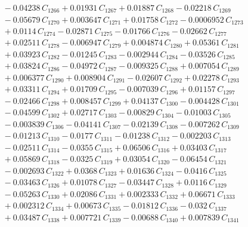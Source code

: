 \documentclass[a4paper,11pt]{article}
\begin{document}
\begin{align}
&\quad - 0.04238\,C_{1266} + 0.01931\,C_{1267} + 0.01887\,C_{1268} - 0.02218\,C_{1269} \nonumber\\
&\quad - 0.05679\,C_{1270} + 0.003647\,C_{1271} + 0.01758\,C_{1272} - 0.0006952\,C_{1273} \nonumber\\
&\quad + 0.0114\,C_{1274} - 0.02871\,C_{1275} - 0.01766\,C_{1276} - 0.02662\,C_{1277} \nonumber\\
&\quad + 0.02511\,C_{1278} - 0.006947\,C_{1279} + 0.004874\,C_{1280} + 0.05361\,C_{1281} \nonumber\\
&\quad + 0.03923\,C_{1282} - 0.01245\,C_{1283} - 0.002944\,C_{1284} - 0.03526\,C_{1285} \nonumber\\
&\quad + 0.03824\,C_{1286} - 0.04972\,C_{1287} - 0.009325\,C_{1288} + 0.007054\,C_{1289} \nonumber\\
&\quad + 0.006377\,C_{1290} + 0.008904\,C_{1291} - 0.02607\,C_{1292} + 0.02278\,C_{1293} \nonumber\\
&\quad + 0.03311\,C_{1294} + 0.01709\,C_{1295} - 0.007039\,C_{1296} + 0.01157\,C_{1297} \nonumber\\
&\quad - 0.02466\,C_{1298} + 0.008457\,C_{1299} + 0.04137\,C_{1300} - 0.004428\,C_{1301} \nonumber\\
&\quad - 0.04599\,C_{1302} + 0.02717\,C_{1303} - 0.00829\,C_{1304} - 0.01003\,C_{1305} \nonumber\\
&\quad - 0.003839\,C_{1306} - 0.04141\,C_{1307} - 0.02139\,C_{1308} - 0.007262\,C_{1309} \nonumber\\
&\quad - 0.01213\,C_{1310} - 0.0177\,C_{1311} - 0.01238\,C_{1312} - 0.002203\,C_{1313} \nonumber\\
&\quad - 0.02511\,C_{1314} - 0.0355\,C_{1315} + 0.06506\,C_{1316} + 0.03403\,C_{1317} \nonumber\\
&\quad + 0.05869\,C_{1318} - 0.0325\,C_{1319} + 0.03054\,C_{1320} - 0.06454\,C_{1321} \nonumber\\
&\quad - 0.002693\,C_{1322} + 0.0368\,C_{1323} + 0.01636\,C_{1324} - 0.0416\,C_{1325} \nonumber\\
&\quad - 0.03463\,C_{1326} + 0.01078\,C_{1327} - 0.03447\,C_{1328} + 0.0116\,C_{1329} \nonumber\\
&\quad - 0.05263\,C_{1330} + 0.02086\,C_{1331} + 0.002333\,C_{1332} + 0.06671\,C_{1333} \nonumber\\
&\quad + 0.002312\,C_{1334} + 0.00673\,C_{1335} - 0.01812\,C_{1336} - 0.032\,C_{1337} \nonumber\\
&\quad + 0.03487\,C_{1338} + 0.007721\,C_{1339} - 0.00688\,C_{1340} + 0.007839\,C_{1341} \nonumber\\

\end{align}
\end{document}
